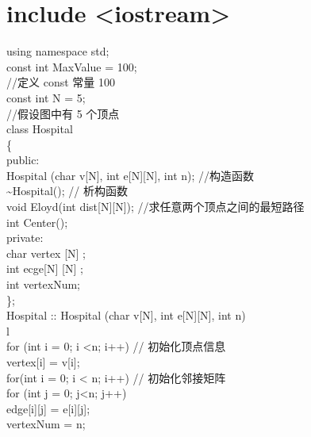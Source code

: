 \documentclass[10pt]{article}
\begin{document}
\section*{include <iostream>}
using namespace std;\\
const int MaxValue = 100;\\
//定义 const 常量 100\\
const int N = 5;\\
//假设图中有 5 个顶点\\
class Hospital\\
\{\\
public:\\[0pt]
Hospital (char v[N], int e[N][N], int n); //构造函数\\
\~{}Hospital(); // 析构函数\\[0pt]
void Eloyd(int dist[N][N]); //求任意两个顶点之间的最短路径\\
int Center();\\
private:\\[0pt]
char vertex [N] ;\\[0pt]
int ecge[N] [N] ;\\
int vertexNum;\\
\};\\[0pt]
Hospital :: Hospital (char v[N], int e[N][N], int n)\\
l\\
for (int i = 0; i <n; i++) // 初始化顶点信息\\[0pt]
vertex[i] = v[i];\\
for(int i = 0; i < n; i++) // 初始化邻接矩阵\\
for (int j = 0; j<n; j++)\\[0pt]
edge[i][j] = e[i][j];\\
vertexNum = n;

\begin{verbatim}

\end{verbatim}
\end{document}
